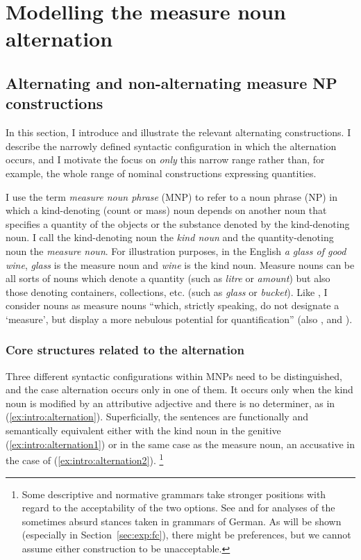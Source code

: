 \section{Modelling the measure noun alternation}
\label{sec:germanmeasurenps}

\subsection{Alternating and non-alternating measure NP constructions}
\label{sec:descriptive}

In this section, I introduce and illustrate the relevant alternating constructions.
I describe the narrowly defined syntactic configuration in which the alternation occurs, and I motivate the focus on \textit{only} this narrow range rather than, for example, the whole range of nominal constructions expressing quantities.

I use the term \textit{measure noun phrase} (MNP) to refer to a noun phrase (NP) in which a kind-denoting (count or mass) noun depends on another noun that specifies a quantity of the objects or the substance denoted by the kind-denoting noun.
I call the kind-denoting noun the \textit{kind noun} and the quantity-denoting noun the \textit{measure noun}.
For illustration purposes, in the English \textit{a glass of good wine}, \textit{glass} is the measure noun and \textit{wine} is the kind noun.
Measure nouns can be all sorts of nouns which denote a quantity (such as \textit{litre} or \textit{amount}) but also those denoting containers, collections, etc. (such as \textit{glass} or \textit{bucket}).
Like \citet[284]{Brems2003}, I consider nouns as measure nouns ``which, strictly speaking, do not designate a `measure', but display a more nebulous potential for quantification'' (also \citealp[530]{Koptjevskaja2001}, and \citealp[338]{Rutkowski2007}).

\subsubsection{Core structures related to the alternation}

Three different syntactic configurations within MNPs need to be distinguished, and the case alternation occurs only in one of them.
It occurs only when the kind noun is modified by an attributive adjective and there is no determiner, as in (\ref{ex:intro:alternation}).
Superficially, the sentences are functionally and semantically equivalent either with the kind noun in the genitive (\ref{ex:intro:alternation1}) or in the same case as the measure noun, an accusative in the case of (\ref{ex:intro:alternation2}).%
\footnote{Some descriptive and normative grammars take stronger positions with regard to the acceptability of the two options.
See \cite{Hentschel1993} and \cite{Zimmer2015} for analyses of the sometimes absurd stances taken in grammars of German.
As will be shown (especially in Section~\ref{sec:exp:fc}), there might be preferences, but we cannot assume either construction to be unacceptable.
}

